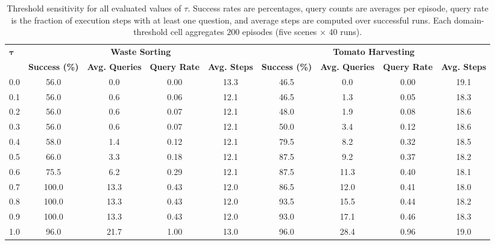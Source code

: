 \begin{table}[t]
\centering
\caption{Threshold sensitivity for all evaluated values of $\tau$. Success rates are percentages, query counts are averages per episode, query rate is the fraction of execution steps with at least one question, and average steps are computed over successful runs. Each domain-threshold cell aggregates $200$ episodes (five scenes $\times$ 40 runs).}
\label{tab:sys_tau}
\footnotesize
\setlength{\tabcolsep}{2pt}
\begin{tabular*}{\textwidth}{@{\extracolsep{\fill}}lcccccccc}
\toprule
\multirow{2}{*}{$\boldsymbol{\tau}$} & \multicolumn{4}{c}{\textbf{Waste Sorting}} & \multicolumn{4}{c}{\textbf{Tomato Harvesting}} \\
\cmidrule(lr){2-5}\cmidrule(lr){6-9}
& \textbf{Success (\%)} & \textbf{Avg. Queries} & \textbf{Query Rate} & \textbf{Avg. Steps} & \textbf{Success (\%)} & \textbf{Avg. Queries} & \textbf{Query Rate} & \textbf{Avg. Steps} \\
\midrule
0.0 & 56.0 & 0.0 & 0.00 & 13.3 & 46.5 & 0.0 & 0.00 & 19.1 \\
0.1 & 56.0 & 0.6 & 0.06 & 12.1 & 46.5 & 1.3 & 0.05 & 18.3 \\
0.2 & 56.0 & 0.6 & 0.07 & 12.1 & 48.0 & 1.9 & 0.08 & 18.6 \\
0.3 & 56.0 & 0.6 & 0.07 & 12.1 & 50.0 & 3.4 & 0.12 & 18.6 \\
0.4 & 58.0 & 1.4 & 0.12 & 12.1 & 79.5 & 8.2 & 0.32 & 18.5 \\
0.5 & 66.0 & 3.3 & 0.18 & 12.1 & 87.5 & 9.2 & 0.37 & 18.2 \\
0.6 & 75.5 & 6.2 & 0.29 & 12.1 & 87.5 & 11.3 & 0.40 & 18.1 \\
0.7 & 100.0 & 13.3 & 0.43 & 12.0 & 86.5 & 12.0 & 0.41 & 18.0 \\
0.8 & 100.0 & 13.3 & 0.43 & 12.0 & 93.5 & 15.5 & 0.44 & 18.2 \\
0.9 & 100.0 & 13.3 & 0.43 & 12.0 & 93.0 & 17.1 & 0.46 & 18.3 \\
1.0 & 96.0 & 21.7 & 1.00 & 13.0 & 96.0 & 28.4 & 0.96 & 19.0 \\
\bottomrule
\end{tabular*}
\end{table}
